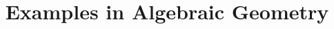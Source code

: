 \documentclass[10pt,openany]{amsbook}
\begin{document}
\title[Examples in Algebraic Geometry]{
  \vspace{0.5in}
  {\Huge{Examples in Algebraic Geometry}} \\
  \vspace{0.5in}
}



\date{}

\maketitle

\tableofcontents






\end{document}
